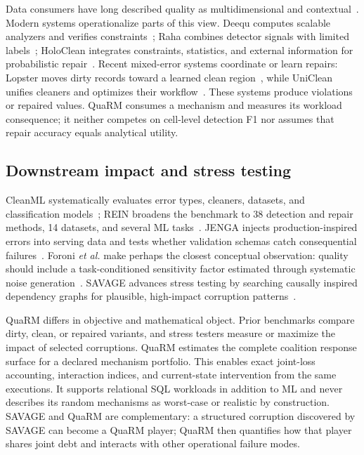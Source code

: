 \documentclass[conference]{IEEEtran}
\newcommand{\method}{QuaRM}
\begin{document}
Data consumers have long described quality as multidimensional and contextual~\cite{wang1996beyond}. Modern systems operationalize parts of this view. Deequ computes scalable analyzers and verifies constraints~\cite{schelter2018deequ}; Raha combines detector signals with limited labels~\cite{mahdavi2019raha}; HoloClean integrates constraints, statistics, and external information for probabilistic repair~\cite{rekatsinas2017holoclean}. Recent mixed-error systems coordinate or learn repairs: Lopster moves dirty records toward a learned clean region~\cite{reis2024lopster}, while UniClean unifies cleaners and optimizes their workflow~\cite{ding2025uniclean}. These systems produce violations or repaired values. \method{} consumes a mechanism and measures its workload consequence; it neither competes on cell-level detection F1 nor assumes that repair accuracy equals analytical utility.

\subsection{Downstream impact and stress testing}

CleanML systematically evaluates error types, cleaners, datasets, and classification models~\cite{li2021cleanml}; REIN broadens the benchmark to 38 detection and repair methods, 14 datasets, and several ML tasks~\cite{abdelaal2023rein}. JENGA injects production-inspired errors into serving data and tests whether validation schemas catch consequential failures~\cite{schelter2021jenga}. Foroni \emph{et al.} make perhaps the closest conceptual observation: quality should include a task-conditioned sensitivity factor estimated through systematic noise generation~\cite{foroni2021effects}. SAVAGE advances stress testing by searching causally inspired dependency graphs for plausible, high-impact corruption patterns~\cite{zhu2025savage}.

\method{} differs in objective and mathematical object. Prior benchmarks compare dirty, clean, or repaired variants, and stress testers measure or maximize the impact of selected corruptions. \method{} estimates the complete coalition response surface for a declared mechanism portfolio. This enables exact joint-loss accounting, interaction indices, and current-state intervention from the same executions. It supports relational SQL workloads in addition to ML and never describes its random mechanisms as worst-case or realistic by construction. SAVAGE and \method{} are complementary: a structured corruption discovered by SAVAGE can become a \method{} player; \method{} then quantifies how that player shares joint debt and interacts with other operational failure modes.
\end{document}
